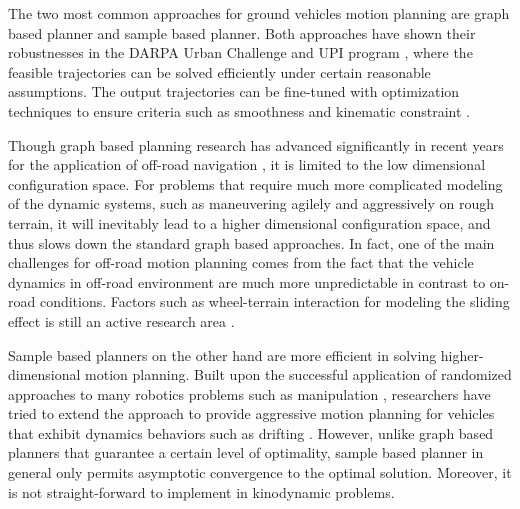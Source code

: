 \documentclass[../thesis.tex]{subfiles}
\begin{document}
 
The two most common approaches for ground vehicles motion planning are graph based planner and sample based planner. 
Both approaches have shown their robustnesses in the DARPA Urban Challenge \cite{koenig2002d,kuwata2008motion} and UPI program \cite{kelly2006toward,stentz2007crusher}, where the feasible trajectories can be solved efficiently under certain reasonable assumptions. The output trajectories can be fine-tuned with optimization techniques to ensure criteria such as smoothness and kinematic constraint \cite{dolgov2008practical}.
 
 
Though graph based planning research has advanced significantly in recent years for the application of off-road navigation \cite{kelly2006toward,stentz2007crusher}, it is limited to the low dimensional configuration space.
For problems that require much more complicated modeling of the dynamic systems, such as maneuvering agilely and aggressively on rough terrain, it will inevitably lead to a higher dimensional configuration space, and thus slows down the standard graph based approaches. 
In fact, one of the main challenges for off-road motion planning comes from the fact that the vehicle dynamics in off-road environment are much more unpredictable in contrast to on-road conditions. 
Factors such as wheel-terrain interaction for modeling the sliding effect is still an active research area \cite{shibly2005equivalent,rubinstein2004detailed}. 
 
 
Sample based planners on the other hand are more efficient in solving higher-dimensional motion planning. 
Built upon the successful application of randomized approaches to many robotics problems such as manipulation \cite{kuffner2000rrt}, researchers have tried to extend the approach to provide aggressive motion planning for vehicles that exhibit dynamics behaviors such as drifting  \cite{hwan2011anytime}. However, unlike graph based planners that guarantee a certain level of optimality, sample based planner in general only permits asymptotic convergence to the optimal solution. Moreover, it is not straight-forward to implement in kinodynamic problems.
 
\end{document}
